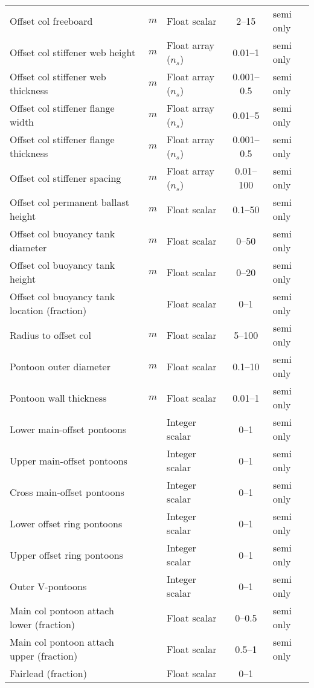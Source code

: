 \begin{table}[htbp]
\begin{center}
{\begin{tabular}{ l c l c l }
    Offset col freeboard & \unit{$m$} & Float scalar &2--15 &semi only\\
    Offset col stiffener web height & \unit{$m$} & Float array ($n_s$) &0.01--1&semi only\\
    Offset col stiffener web thickness & \unit{$m$} & Float array ($n_s$) & 0.001--0.5&semi only\\
    Offset col stiffener flange width & \unit{$m$} & Float array ($n_s$) & 0.01--5&semi only\\
    Offset col stiffener flange thickness & \unit{$m$} & Float array ($n_s$) & 0.001--0.5&semi only\\
    Offset col stiffener spacing & \unit{$m$} & Float array ($n_s$) &0.01--100&semi only\\
    Offset col permanent ballast height & \unit{$m$} & Float scalar &0.1--50&semi only\\
    Offset col buoyancy tank diameter & \unit{$m$} & Float scalar &0--50 & semi only\\
    Offset col buoyancy tank height & \unit{$m$} & Float scalar &0--20 & semi only\\
    Offset col buoyancy tank location (fraction) && Float scalar & 0--1 & semi only\\
    Radius to offset col & \unit{$m$} & Float scalar &5--100 &semi only\\
    \hline
    Pontoon outer diameter & \unit{$m$} & Float scalar &0.1--10 &semi only\\
    Pontoon wall thickness & \unit{$m$} & Float scalar &0.01--1 &semi only\\
    Lower main-offset pontoons && Integer scalar & 0--1 & semi only\\
    Upper main-offset pontoons && Integer scalar & 0--1 & semi only\\
    Cross main-offset pontoons && Integer scalar & 0--1 & semi only\\
    Lower offset ring pontoons && Integer scalar & 0--1 & semi only\\
    Upper offset ring pontoons && Integer scalar & 0--1 & semi only\\
    Outer V-pontoons && Integer scalar & 0--1 & semi only\\
    Main col pontoon attach lower (fraction) && Float scalar & 0--0.5&semi only\\
    Main col pontoon attach upper (fraction) && Float scalar & 0.5--1&semi only\\
    \hline
    Fairlead (fraction) && Float scalar &0--1 &\\

\end{tabular}}
\end{center}
\end{table}
